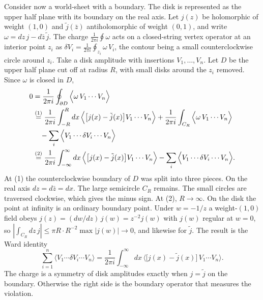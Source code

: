 \begin{tcolorbox}[breakable]
\begin{remark}
Consider now a world-sheet with a boundary. The disk is represented as the upper half plane with its boundary on the real axis. Let $j(z)$ be holomorphic of weight $(1,0)$ and $\tilde j(\bar z)$ antiholomorphic of weight $(0,1)$, and write $\omega = dz\,j - d\bar z\,\tilde j$. The charge $\frac{1}{2\pi i}\oint\omega$ acts on a closed-string vertex operator at an interior point $z_i$ as $\delta V_i = \frac{1}{2\pi i}\oint_{z_i}\omega\,V_i$, the contour being a small counterclockwise circle around $z_i$. Take a disk amplitude with insertions $V_1,\dots,V_n$. Let $D$ be the upper half plane cut off at radius $R$, with small disks around the $z_i$ removed. Since $\omega$ is closed in $D$,
\begin{align*}
0 &= \frac{1}{2\pi i}\oint_{\partial D}\Big\langle \omega\, V_1\cdots V_n\Big\rangle \\
&\overset{(1)}{=} \frac{1}{2\pi i}\int_{-R}^{R}dx\,\Big\langle\big[j(x)-\tilde j(x)\big]V_1\cdots V_n\Big\rangle + \frac{1}{2\pi i}\int_{C_R}\Big\langle\omega\,V_1\cdots V_n\Big\rangle \\
&\quad - \sum_i\Big\langle V_1\cdots\delta V_i\cdots V_n\Big\rangle \\
&\overset{(2)}{=} \frac{1}{2\pi i}\int_{-\infty}^{\infty}dx\,\Big\langle\big[j(x)-\tilde j(x)\big]V_1\cdots V_n\Big\rangle - \sum_i\Big\langle V_1\cdots\delta V_i\cdots V_n\Big\rangle .
\end{align*}
At (1) the counterclockwise boundary of $D$ was split into three pieces. On the real axis $dz = d\bar z = dx$. The large semicircle $C_R$ remains. The small circles are traversed clockwise, which gives the minus sign. At (2), $R\to\infty$. On the disk the point at infinity is an ordinary boundary point. Under $w = -1/z$ a weight-$(1,0)$ field obeys $j(z) = (dw/dz)\,j(w) = z^{-2}j(w)$ with $j(w)$ regular at $w=0$, so $|\int_{C_R}dz\,j| \le \pi R\cdot R^{-2}\max|j(w)|\to0$, and likewise for $\tilde j$. The result is the Ward identity
\begin{equation}
\sum_{i=1}^n \Big\langle V_1\cdots \delta V_i \cdots V_n\Big\rangle = \frac{1}{2\pi i}\int_{-\infty}^{\infty} dx\,\Big\langle \big[j(x)-\tilde j(x)\big]\, V_1\cdots V_n\Big\rangle .
\tag{D.3}\label{ward}
\end{equation}
The charge is a symmetry of disk amplitudes exactly when $j=\tilde j$ on the boundary. Otherwise the right side is the boundary operator that measures the violation.


\end{remark}
\end{tcolorbox}

